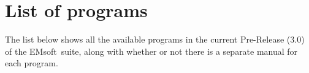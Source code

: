\documentclass[DIV=calc, paper=letter, fontsize=11pt]{scrartcl}	 %
\newcommand{\ctp}{\textsf{EMsoft}}
\begin{document}
\newpage
\section{List of programs}
The list below shows all the available programs in the current Pre-Release (3.0) of the \ctp\ suite, along with whether or not there is a 
separate manual for each program.  

\end{document}
